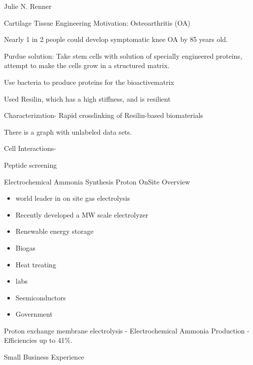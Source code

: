 \documentclass{article}
\begin{document}
\begin{section}{Julie N. Renner}
	\begin{subsection}{Cartilage Tissue Engineering}
		Motivation: Osteoarthritis (OA)

		Nearly 1 in 2 people could develop symptomatic knee OA by 85 years old.

		Purdue solution: Take stem cells with solution of specially engineered proteins, attempt to make the cells grow in a structured matrix.

		Use bacteria to produce proteins for the bioactivematrix

		Used Resilin, which has a high stiffness, and is resilient

		Characterization- Rapid crosslinking of Resilin-based biomaterials

		There is a graph with unlabeled data sets. 

		Cell Interactions- 

		Peptide screening


	\end{subsection}
	\begin{subsection}{Electrochemical Ammonia Synthesis}
		Proton OnSite Overview
		\begin{itemize}
			\item world leader in on site gas electrolysis
			\item Recently developed a MW scale electrolyzer
			\item Renewable energy storage
			\item Biogas
			\item Heat treating
			\item labs
			\item Seemiconductors
			\item Government
		\end{itemize}

		Proton exchange membrane electrolysis -
		Electrochemical Ammonia Production
		- Efficiencies up to 41\%.
	\end{subsection}
	\begin{subsection}{Small Business Experience}
	\end{subsection}
\end{section}
\end{document}
